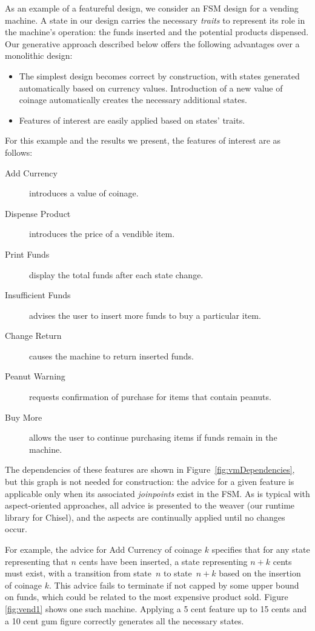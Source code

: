 \documentclass[sigplan,anonymous,review]{acmart}
\begin{document}
As an example of a featureful design, we consider an FSM design for a vending machine.   A state in our design carries the necessary \emph{traits} to represent its role in the machine's operation:  the funds inserted and the potential products dispensed.  Our generative approach described below offers the following advantages over a monolithic design:
\begin{itemize}
    \item The simplest design becomes correct by construction, with states generated automatically based on currency values.  Introduction of a new value of coinage automatically creates the necessary additional states.
    \item Features of interest are easily applied based on states' traits.
\end{itemize}
For this example and the results we present, the features of interest are as follows:
\begin{description}
    \item[Add Currency] introduces a value of coinage.
    \item[Dispense Product] introduces the price of a vendible item.
    \item[Print Funds] display the total funds after each state change.
    \item[Insufficient Funds] advises the user to insert more funds to buy a particular item.
    \item[Change Return] causes the machine to return inserted funds.
    \item[Peanut Warning] requests confirmation of purchase for items that contain peanuts.
    \item[Buy More] allows the user to continue purchasing items if funds remain in the machine.
\end{description}
The dependencies of these features are shown in Figure~\ref{fig:vmDependencies}, but this graph is not needed for construction:  the advice for a given feature is applicable only when its associated \emph{joinpoints} exist in the FSM.  As is typical with aspect-oriented approaches, all advice is presented to the weaver (our runtime library for Chisel), and the aspects are continually applied until no changes occur.

For example, the advice for Add Currency of coinage $k$ specifies that for any state representing that $n$ cents have been inserted, a state representing $n+k$ cents must exist, with a transition from state~$n$ to state~$n+k$ based on the insertion of coinage $k$.   This advice fails to terminate if not capped by some upper bound on funds, which could be related to the most expensive product sold. Figure \ref{fig:vend1} shows one such machine. Applying a 5 cent feature up to 15 cents and a 10 cent gum figure correctly generates all the necessary states. 
\end{document}
